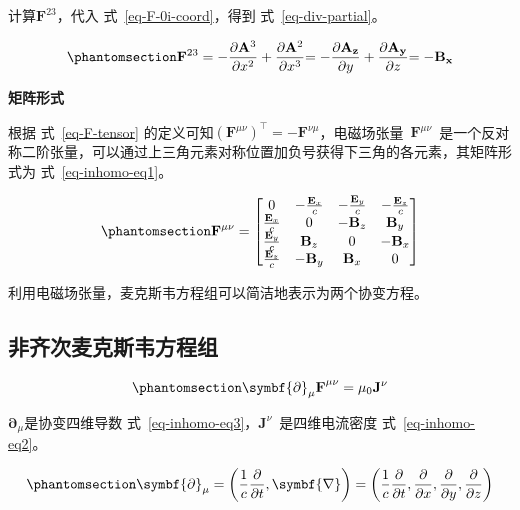\documentclass[
  chinese,
  a4paper,
  UTF8,
  12pt,
  oneside,
  openany]{ctexbook}
\begin{document}
计算\(\mathbf{F}^{23}\)，代入 式~\ref{eq-F-0i-coord}，得到
式~\ref{eq-div-partial}。

\begin{equation}\protect\phantomsection\label{eq-div-partial}{
{\mathbf{F}^{23} = - \frac{\partial\mathbf{A}^{3}}{\partial x^{2}} + \frac{\partial\mathbf{A}^{2}}{\partial x^{3}}
  }{= - \frac{\partial\mathbf{A}_{\mathbf{z}}}{\partial y} + \frac{\partial\mathbf{A}_{\mathbf{y}}}{\partial z}
  }{= - \mathbf{B}_{\mathbf{x}}}
}\end{equation}

\textbf{矩阵形式}

根据 式~\ref{eq-F-tensor}
的定义可知\(\left( \mathbf{F}^{\mu\nu} \right)^{\top} = - \mathbf{F}^{\nu\mu}\)，电磁场张量~\(\mathbf{F}^{\mu\nu}\)~是一个反对称二阶张量，可以通过上三角元素对称位置加负号获得下三角的各元素，其矩阵形式为
式~\ref{eq-inhomo-eq1}。

\begin{equation}\protect\phantomsection\label{eq-inhomo-eq1}{
\mathbf{F}^{\mu\nu} = \begin{bmatrix}
  0 & - \frac{\mathbf{E}_{x}}{c} & - \frac{\mathbf{E}_{y}}{c} & - \frac{\mathbf{E}_{z}}{c} \\
  \frac{\mathbf{E}_{x}}{c} & 0 & - \mathbf{B}_{z} & \mathbf{B}_{y} \\
  \frac{\mathbf{E}_{y}}{c} & \mathbf{B}_{z} & 0 & {- \mathbf{B}}_{x} \\
  \frac{\mathbf{E}_{z}}{c} & - \mathbf{B}_{y} & \mathbf{B}_{x} & 0
  \end{bmatrix}
}\end{equation}

利用电磁场张量，麦克斯韦方程组可以简洁地表示为两个协变方程。

\subsection{非齐次麦克斯韦方程组}\label{ux975eux9f50ux6b21ux9ea6ux514bux65afux97e6ux65b9ux7a0bux7ec4}

\begin{equation}\protect\phantomsection\label{eq-inhomo-eq2}{
{\symbf{\partial}_{\mu}\mathbf{F}}^{\mu\nu} = \mu_{0}\mathbf{J}^{\nu}
}\end{equation}

\(\symbf{\partial}_{\mu}\)是协变四维导数
式~\ref{eq-inhomo-eq3}，\(\mathbf{J}^{\nu}\)~是四维电流密度
式~\ref{eq-inhomo-eq2}。

\begin{equation}\protect\phantomsection\label{eq-inhomo-eq3}{
\symbf{\partial}_{\mu} = \left( \frac{1}{c}\frac{\partial}{\partial t},\symbf{\nabla} \right) = \left( \frac{1}{c}\frac{\partial}{\partial t},\frac{\partial}{\partial x},\frac{\partial}{\partial y},\frac{\partial}{\partial z} \right)
}\end{equation}
\end{document}
